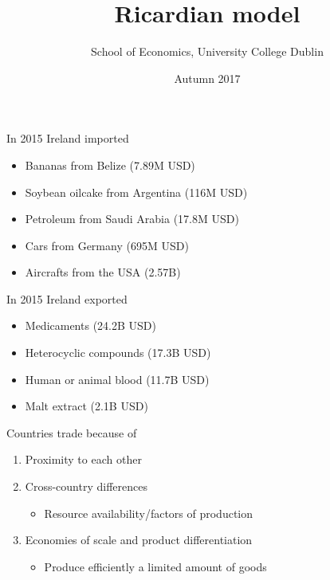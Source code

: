 \documentclass{beamer}
\title{Ricardian model}
\author{School of Economics, University College Dublin}
\date{Autumn 2017}
\begin{document}
\begin{frame}
\titlepage  
\end{frame}


\begin{frame}
  In 2015 Ireland imported
  \begin{itemize}
    \item Bananas from Belize (7.89M USD)
    \item Soybean oilcake from Argentina (116M USD)
    \item Petroleum from Saudi Arabia (17.8M USD)
    \item Cars from Germany (695M USD)
    \item Aircrafts from the USA (2.57B)
  \end{itemize}
\end{frame}

\begin{frame}
  In 2015 Ireland exported
  \begin{itemize}
    \item Medicaments (24.2B USD)
    \item Heterocyclic compounds (17.3B USD)
    \item Human or animal blood (11.7B USD)
    \item Malt extract (2.1B USD)
  \end{itemize}
\end{frame}

\begin{frame}
  Countries trade because of
  \begin{enumerate}
    \item Proximity to each other
    \item Cross-country differences
    \begin{itemize}
      \item Resource availability/factors of production
    \end{itemize}
    \item Economies of scale and product differentiation
    \begin{itemize}
      \item Produce efficiently a limited amount of goods
    \end{itemize}
  \end{enumerate}
\end{frame}
\end{document}
